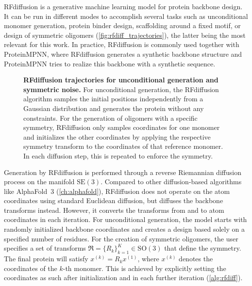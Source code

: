 RFdiffusion is a generative machine learning model for protein backbone design. It can be run in different modes to accomplish several tasks such as unconditional monomer generation, protein binder design, scaffolding around a fixed motif, or design of symmetric oligomers (\autoref{fig:rfdiff_trajectories}), the latter being the most relevant for this work. In practice, RFdiffusion is commonly used together with ProteinMPNN, where RFdiffusion generates a synthetic backbone structure and ProteinMPNN tries to realize this backbone with a synthetic sequence. 

\begin{figure}
\centering

\caption{\textbf{RFdiffusion trajectories for unconditional generation and symmetric noise.} For unconditional generation, the RFdiffusion algorithm samples the initial positions independently from a Gaussian distribution and generates the protein without any constraints. For the generation of oligomers with a specific symmetry, RFdiffusion only samples coordinates for one monomer and initializes the other coordinates by applying the respective symmetry transform to the coordinates of that reference monomer. In each diffusion step, this is repeated to enforce the symmetry. }
\label{fig:rfdiff_trajectories}
\end{figure}

Generation by RFdiffusion is performed through a reverse Riemannian diffusion process on the manifold $\mathrm{SE}(3)$. Compared to other diffusion-based algorithms like AlphaFold~3 (\autoref{ch:alphafold}), RFdiffusion does not operate on the atom coordinates using standard Euclidean diffusion, but diffuses the backbone transforms instead. However, it converts the transforms from and to atom coordinates in each iteration. For unconditional generation, the model starts with randomly initialized backbone coordinates and creates a design based solely on a specified number of residues. For the creation of symmetric oligomers, the user specifies a set of transforms $\mathfrak{R}=\{R_k\}_{k=1}^K \in \mathrm{SO}(3)$ that define the symmetry. The final protein will satisfy $x^{(k)} = R_k x^{(1)}$, where $x^{(k)}$ denotes the coordinates of the $k$-th monomer. This is achieved by explicitly setting the coordinates as such after initialization and in each further iteration (\autoref{alg:rfdiff}). 

